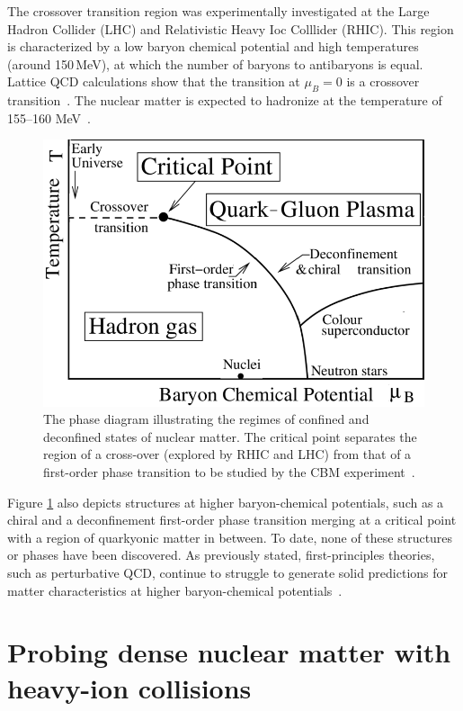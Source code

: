 The crossover transition region was experimentally investigated at the Large Hadron Collider (\gls{LHC}) and Relativistic Heavy Ioc Colllider (\gls{RHIC}). This region is characterized by a low baryon chemical potential and high temperatures (around 150\,MeV), at which the number of baryons to antibaryons is equal. Lattice \gls{QCD} calculations show that the transition at $\mu_{B} = 0$ is a crossover transition~\cite{Aoki_2006}. The nuclear matter is expected to hadronize at the temperature of 155--160 MeV~\cite{Bazavov_2012, Stachel_2014}.



\begin{figure}[!h]
\centering
 \includegraphics[width=0.65\columnwidth]{Chapter1/images/phase.png}
\caption{The phase diagram illustrating the regimes of confined and deconfined states of nuclear matter. The critical point separates the region of a cross-over (explored by \gls{RHIC} and \gls{LHC}) from that of a first-order phase transition to be studied by the CBM experiment~\cite{friese_diagram}.}
\label{fig_phase}
\end{figure}
Figure \ref{fig_phase} also depicts structures at higher baryon-chemical potentials, such as a chiral and a deconfinement first-order phase transition merging at a critical point with a region of quarkyonic matter in between. To date, none of these structures or phases have been discovered. As previously stated, first-principles theories, such as perturbative QCD, continue to struggle to generate solid predictions for matter characteristics at higher baryon-chemical potentials~\cite{Sakai_2008, Fischer_01, Tawfik_01}. 



\section{Probing dense nuclear matter with heavy-ion collisions}

